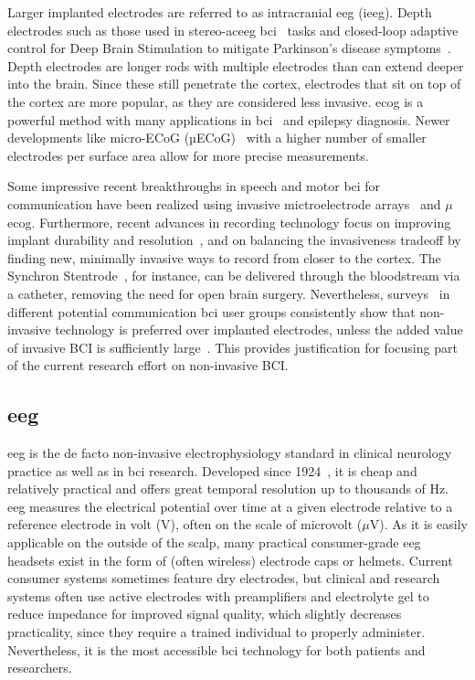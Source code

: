 Larger implanted electrodes are referred to as intracranial \ac{eeg} (i\ac{eeg}).
Depth electrodes such as those used in stereo-ac{eeg} \ac{bci}~\cite{Wu2024} tasks
and closed-loop adaptive control for Deep Brain Stimulation to mitigate
Parkinson's disease symptoms~\cite{Arlotti2018}.
Depth electrodes are longer rods with multiple electrodes than can extend
deeper into the brain.
Since these still penetrate the cortex, electrodes that sit on top of the
cortex are more popular, as they are considered less invasive.
\Ac{ecog} is a powerful method with many applications in \ac{bci}~\cite{Schalk2011} and epilepsy diagnosis.
Newer developments like micro-ECoG (µECoG)~\cite{Shokoueinejad2019} with a
higher number of smaller electrodes per surface area allow for more precise
measurements.

Some impressive recent breakthroughs in speech and motor \ac{bci} for communication
have been realized using
invasive mictroelectrode arrays~\cite{Willett2021} and $\mu$\Ac{ecog}\cite{Metzger2023}.
Furthermore, recent advances in recording technology focus on improving implant
durability and resolution~\cite{Steinmetz2021}, and on balancing the invasiveness
tradeoff by finding new, minimally invasive ways to record from closer to the cortex.
The Synchron Stentrode~\cite{Mitchell2023}, for instance, can be delivered
through the bloodstream via a catheter, removing the need for open brain
surgery.
Nevertheless, surveys~\cite{Huggins2011, Huggins2015, Branco2021} in different
potential communication \ac{bci} user groups consistently show that non-invasive
technology is preferred over implanted electrodes, unless the added value of invasive BCI is
sufficiently large~\cite{Kageyama2020}.
This provides justification for focusing part of the current research effort on
non-invasive BCI.

\subsection{\Acl{eeg}}

\Ac{eeg} is the de facto non-invasive electrophysiology standard in clinical
neurology practice as well as in \ac{bci} research.
Developed since 1924~\cite{Berger1929}, it is cheap and relatively practical and
offers great temporal resolution up to thousands of Hz.
\Ac{eeg} measures the electrical potential over time at a given electrode relative to a
reference electrode in volt (V), often on the scale of microvolt ($\mu$V).
As it is easily applicable on the outside of the scalp, many practical
consumer-grade \ac{eeg} headsets exist in the form of (often wireless) electrode
caps or helmets.
Current consumer systems sometimes feature dry electrodes, but clinical and
research systems often use active electrodes with preamplifiers and
electrolyte gel to reduce impedance for improved signal
quality, which slightly decreases practicality, since they require a trained
individual to properly administer.
Nevertheless, it is the most accessible \ac{bci} technology for both patients
and researchers.


